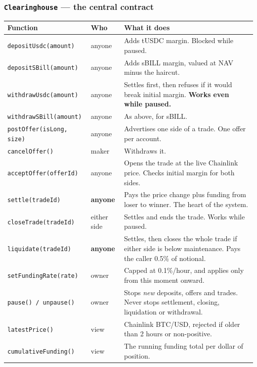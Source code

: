 \documentclass[11pt,a4paper]{article}
\begin{document}
\subsubsection*{\texttt{Clearinghouse} --- the central contract}

\begin{center}
\footnotesize
\begin{tabular}{@{}p{4.5cm}p{2.0cm}p{8.8cm}@{}}
\toprule
\textbf{Function} & \textbf{Who} & \textbf{What it does} \\
\midrule
\texttt{depositUsdc(amount)} & anyone & Adds tUSDC margin. Blocked while paused. \\
\texttt{depositSBill(amount)} & anyone & Adds sBILL margin, valued at NAV minus the haircut. \\
\texttt{withdrawUsdc(amount)} & anyone & Settles first, then refuses if it would break initial margin. \textbf{Works even while paused.} \\
\texttt{withdrawSBill(amount)} & anyone & As above, for sBILL. \\
\texttt{postOffer(isLong, size)} & anyone & Advertises one side of a trade. One offer per account. \\
\texttt{cancelOffer()} & maker & Withdraws it. \\
\texttt{acceptOffer(offerId)} & anyone & Opens the trade at the live Chainlink price. Checks initial margin for both sides. \\
\texttt{settle(tradeId)} & \textbf{anyone} & Pays the price change plus funding from loser to winner. The heart of the system. \\
\texttt{closeTrade(tradeId)} & either side & Settles and ends the trade. Works while paused. \\
\texttt{liquidate(tradeId)} & \textbf{anyone} & Settles, then closes the whole trade if either side is below maintenance. Pays the caller 0.5\% of notional. \\
\texttt{setFundingRate(rate)} & owner & Capped at 0.1\%/hour, and applies only from this moment onward. \\
\texttt{pause() / unpause()} & owner & Stops \emph{new} deposits, offers and trades. Never stops settlement, closing, liquidation or withdrawal. \\
\midrule
\texttt{latestPrice()} & view & Chainlink BTC/USD, rejected if older than 2 hours or non-positive. \\
\texttt{cumulativeFunding()} & view & The running funding total per dollar of position. \\

\end{tabular}
\end{center}
\end{document}
